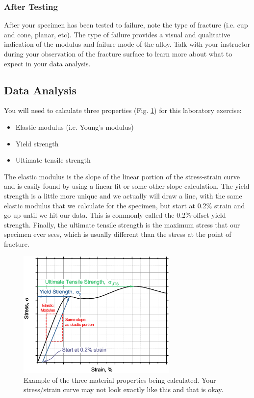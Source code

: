 \documentclass[12pt]{article}
\begin{document}
\subsubsection{After Testing}
After your specimen has been tested to failure, note the type of fracture (i.e. cup and cone, planar, etc). The type of failure provides a visual and qualitative indication of the modulus and failure mode of the alloy. Talk with your instructor during your observation of the fracture surface to learn more about what to expect in your data analysis.

\newpage
\subsection{Data Analysis}
You will need to calculate three properties (Fig. \ref{fig:prop}) for this laboratory exercise:
\begin{itemize}
    \item Elastic modulus (i.e. Young's modulus)
    \item Yield strength
    \item Ultimate tensile strength
\end{itemize}

The elastic modulus is the slope of the linear portion of the stress-strain curve and is easily found by using a linear fit or some other slope calculation. The yield strength is a little more unique and we actually will draw a line, with the same elastic modulus that we calculate for the specimen, but start at 0.2\% strain and go up until we hit our data. This is commonly called the 0.2\%-offset yield strength. Finally, the ultimate tensile strength is the maximum stress that our specimen ever sees, which is usually different than the stress at the point of fracture.

\begin{figure}[h]
    \centering
    \includegraphics[width=0.7\textwidth]{true1.eps}
    \caption{Example of the three material properties being calculated. Your stress/strain curve may not look exactly like this and that is okay.}
    \label{fig:prop}
\end{figure}
\end{document}
